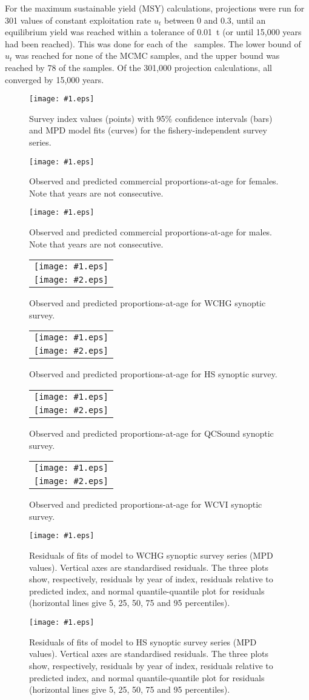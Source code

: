 \documentclass[11pt]{book}
\newcommand\onefig[2]{    %
  \begin{figure}[!htp]
  \begin{center}
	\texttt{[image: \#1.eps]} \\  %
  \end{center}
  \caption{#2 }
  \label{fig:#1} 
  \end{figure}
}
\newcommand\twofig[3]{   %
  \begin{figure}[!htp]     %
  \centering
  \begin{tabular}{c}
	\texttt{[image: \#1.eps]} \\  %
	\texttt{[image: \#2.eps]}
  \end{tabular}
  \caption{#3}
  \label{fig:#1}
  \end{figure}
  \clearpage
}
\begin{document}
For the maximum sustainable yield (MSY) calculations, projections were run for 301 values of constant exploitation rate $u_t$ between 0 and 0.3, until an equilibrium yield was reached within a tolerance of 0.01~t (or until 15,000 years had been reached). This was done for each of the \numMCMC~samples.
The lower bound of $u_t$ was reached for  none  of the MCMC samples, and the upper bound was reached by 78 of the samples.
Of the 301,000 projection calculations,  all converged  by 15,000 years.


\onefig{survIndSer2}{Survey index values (points) with 95\% confidence intervals (bars) and MPD model fits (curves) for the fishery-independent survey series.}

\onefig{ageCommFemale1}{Observed and predicted commercial proportions-at-age for females. Note that years are not consecutive.}

\onefig{ageCommMale1}{Observed and predicted commercial proportions-at-age for males. Note that years are not consecutive.}

\clearpage 

\twofig{ageSurvWCHGSynopticFemale1}{ageSurvWCHGSynopticMale1}{Observed and predicted proportions-at-age for WCHG synoptic survey.}

\twofig{ageSurvHSSynopticFemale2}{ageSurvHSSynopticMale2}{Observed and predicted proportions-at-age for HS synoptic survey.}

\twofig{ageSurvQCSoundSynopticFemale3}{ageSurvQCSoundSynopticMale3}{Observed and predicted proportions-at-age for QCSound synoptic survey.}

\twofig{ageSurvWCVISynopticFemale4}{ageSurvWCVISynopticMale4}{Observed and predicted proportions-at-age for WCVI synoptic survey.}

\clearpage

\onefig{survResWCHGSynoptic}{Residuals of fits of model to WCHG synoptic survey series (MPD values). Vertical axes are standardised residuals. The three plots show, respectively, residuals by year of index, residuals relative to predicted index, and normal quantile-quantile plot for residuals (horizontal lines give 5, 25, 50, 75 and 95 percentiles).}

\onefig{survResHSSynoptic}{Residuals of fits of model to HS synoptic survey series (MPD values). Vertical axes are standardised residuals. The three plots show, respectively, residuals by year of index, residuals relative to predicted index, and normal quantile-quantile plot for residuals (horizontal lines give 5, 25, 50, 75 and 95 percentiles).}
\end{document}
